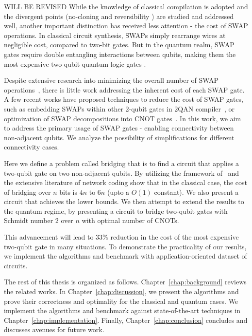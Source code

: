 { \color{blue} WILL BE REVISED
While the knowledge of classical compilation is adopted and the divergent points (no-cloning \cite[TODO]{} and reversibility \cite{shende2003}) are studied and addressed well, another important distinction has received less attention - the cost of SWAP operations. In classical circuit synthesis, SWAPs simply rearrange wires at negligible cost, compared to two-bit gates. But in the quantum realm, SWAP gates require double entangling \cite[TODO]{} interactions between qubits, making them the most expensive two-qubit quantum logic gates \cite[TODO]{}. 

Despite extensive research into minimizing the overall number of SWAP operations~\cite[TODO]{childs}, there is little work addressing the inherent cost of each SWAP gate. A few recent works have proposed techniques to reduce the cost of SWAP gates, such as embedding SWAPs within other 2-qubit gates in 2QAN compiler~\cite{lao2021}, or optimization of SWAP decompositions into CNOT gates~\cite{kissinger2019,nash2020}. In this work, we aim to address the primary usage of SWAP gates - enabling connectivity between non-adjacent qubits. We analyze the possibility of simplifications for different connectivity cases.

Here we define a problem called bridging that is to find a circuit that applies a two-qubit gate on two non-adjacent qubits. By utilizing the framework of~\cite{kissinger2019} and the extensive literature of network coding \cite[TODO]{} show that in the classical case, the cost of bridging over $n$ bits is $4n$ to $6n$ (upto a $O(1)$ constant). We also present a circuit that achieves the lower bounds. We then attempt to extend the results to the quantum regime, by presenting a circuit to bridge two-qubit gates with Schmidt number $2$ over $n$ with optimal number of CNOTs.

This advancement will lead to $33\%$ reduction in the cost of the most expensive two-qubit gate in many situations. To demonstrate the practicality of our results, we implement the algorithms and benchmark with application-oriented dataset of circuits.

The rest of this thesis is organized as follows. Chapter~\ref{chap:background} reviews the related works. In Chapter~\ref{chap:discussion}, we present the algorithms and prove their correctness and optimality for the classical and quantum cases. We implement the algorithms and benchmark against state-of-the-art techniques in Chapter~\ref{chap:implementation}. Finally, Chapter~\ref{chap:conclusion} concludes and discusses avenues for future work. }
